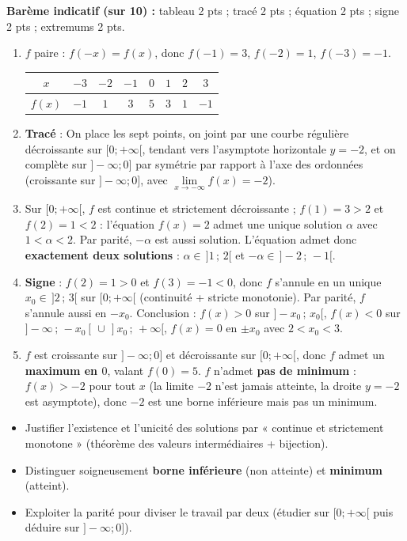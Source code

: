 \documentclass[11pt]{article}
\begin{document}
\begin{corrige}
\textbf{Barème indicatif (sur 10) :} tableau 2 pts ; tracé 2 pts ; équation 2 pts ; signe 2 pts ; extremums 2 pts.
\begin{enumerate}
    \item $f$ paire : $f(-x)=f(x)$, donc $f(-1)=3$, $f(-2)=1$, $f(-3)=-1$.
    \begin{center}
    \begin{tabular}{|c|c|c|c|c|c|c|c|}\hline
    $x$ & $-3$ & $-2$ & $-1$ & $0$ & $1$ & $2$ & $3$ \\ \hline
    $f(x)$ & $-1$ & $1$ & $3$ & $5$ & $3$ & $1$ & $-1$ \\ \hline
    \end{tabular}
    \end{center}
    \item \textbf{Tracé} : On place les sept points, on joint par une courbe régulière décroissante sur $[0;+\infty[$, tendant vers l'asymptote horizontale $y=-2$, et on complète sur $]-\infty;0]$ par symétrie par rapport à l'axe des ordonnées (croissante sur $]-\infty;0]$, avec $\lim\limits_{x\to-\infty}f(x)=-2$).
    \item Sur $[0;+\infty[$, $f$ est continue et strictement décroissante ; $f(1)=3>2$ et $f(2)=1<2$ : l'équation $f(x)=2$ admet une unique solution $\alpha$ avec $1<\alpha<2$. Par parité, $-\alpha$ est aussi solution. L'équation admet donc \textbf{exactement deux solutions} : $\alpha\in\,]1\,;\,2[$ et $-\alpha\in\,]-2\,;\,-1[$.
    \item \textbf{Signe} : $f(2)=1>0$ et $f(3)=-1<0$, donc $f$ s'annule en un unique $x_0\in\,]2\,;\,3[$ sur $[0;+\infty[$ (continuité + stricte monotonie). Par parité, $f$ s'annule aussi en $-x_0$.
    Conclusion : $f(x)>0$ sur $]-x_0\,;\,x_0[$, $f(x)<0$ sur $]-\infty\,;\,-x_0[\,\cup\,]x_0\,;\,+\infty[$, $f(x)=0$ en $\pm x_0$ avec $2<x_0<3$.
    \item $f$ est croissante sur $]-\infty;0]$ et décroissante sur $[0;+\infty[$, donc $f$ admet un \textbf{maximum en $0$}, valant $f(0)=5$.
    $f$ n'admet \textbf{pas de minimum} : $f(x)>-2$ pour tout $x$ (la limite $-2$ n'est jamais atteinte, la droite $y=-2$ est asymptote), donc $-2$ est une borne inférieure mais pas un minimum.
\end{enumerate}
\begin{attention}
\begin{itemize}
    \item Justifier l'existence et l'unicité des solutions par « continue et strictement monotone » (théorème des valeurs intermédiaires + bijection).
    \item Distinguer soigneusement \textbf{borne inférieure} (non atteinte) et \textbf{minimum} (atteint).
    \item Exploiter la parité pour diviser le travail par deux (étudier sur $[0;+\infty[$ puis déduire sur $]-\infty;0]$).
\end{itemize}
\end{attention}
\end{corrige}
\end{document}
